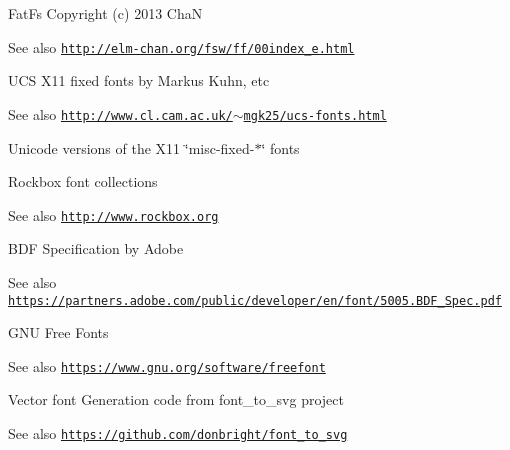 \begin{DoxyParagraph}{Fat\+Fs Copyright (c) 2013 ChaN}

\end{DoxyParagraph}
\begin{DoxySeeAlso}{See also}
\href{http://elm-chan.org/fsw/ff/00index_e.html}{\tt http\+://elm-\/chan.\+org/fsw/ff/00index\+\_\+e.\+html} 

 
\end{DoxySeeAlso}
\begin{DoxyParagraph}{U\+CS X11 fixed fonts by Markus Kuhn, etc}

\end{DoxyParagraph}
\begin{DoxySeeAlso}{See also}
\href{http://www.cl.cam.ac.uk/~mgk25/ucs-fonts.html}{\tt http\+://www.\+cl.\+cam.\+ac.\+uk/$\sim$mgk25/ucs-\/fonts.\+html}
\begin{DoxyItemize}
\item Unicode versions of the X11 \char`\"{}misc-\/fixed-\/$\ast$\char`\"{} fonts 

 
\end{DoxyItemize}
\end{DoxySeeAlso}
\begin{DoxyParagraph}{Rockbox font collections}

\end{DoxyParagraph}
\begin{DoxySeeAlso}{See also}
\href{http://www.rockbox.org}{\tt http\+://www.\+rockbox.\+org} 

 
\end{DoxySeeAlso}
\begin{DoxyParagraph}{B\+DF Specification by Adobe}

\end{DoxyParagraph}
\begin{DoxySeeAlso}{See also}
\href{https://partners.adobe.com/public/developer/en/font/5005.BDF_Spec.pdf}{\tt https\+://partners.\+adobe.\+com/public/developer/en/font/5005.\+B\+D\+F\+\_\+\+Spec.\+pdf} 

 
\end{DoxySeeAlso}
\begin{DoxyParagraph}{G\+NU Free Fonts}

\end{DoxyParagraph}
\begin{DoxySeeAlso}{See also}
\href{https://www.gnu.org/software/freefont}{\tt https\+://www.\+gnu.\+org/software/freefont} 

 
\end{DoxySeeAlso}
\begin{DoxyParagraph}{Vector font Generation code from font\+\_\+to\+\_\+svg project}

\end{DoxyParagraph}
\begin{DoxySeeAlso}{See also}
\href{https://github.com/donbright/font_to_svg}{\tt https\+://github.\+com/donbright/font\+\_\+to\+\_\+svg} 
\end{DoxySeeAlso}
